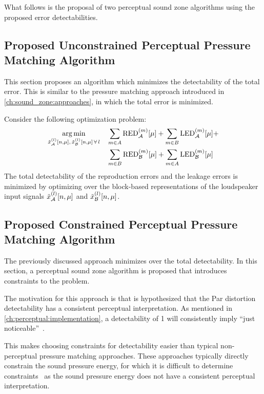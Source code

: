 What follows is the proposal of two perceptual sound zone algorithms using the proposed error detectabilities.

\subsection{Proposed Unconstrained Perceptual Pressure Matching Algorithm}
\label{ch:perceptual_sound_zone:perceptual_minimization:unconstrained}
This section proposes an algorithm which minimizes the detectability of the total error.
This is similar to the pressure matching approach introduced in \autoref{ch:sound_zone:approaches}, 
in which the total error is minimized.

Consider the following optimization problem:
\begin{equation}
    \begin{aligned}
    \argmin{\tilde{x}_\za^{(l)}[n,\mu],\,\tilde{x}_\zb^{(l)}[n,\mu]\,\forall\,l}{
       & \sum_{m\in A}\text{RED}_\za^{(m)}[\mu] + \sum_{m\in B}\text{LED}_\za^{(m)}[\mu] +\\
       & \sum_{m\in B}\text{RED}_\zb^{(m)}[\mu] + \sum_{m\in A}\text{LED}_\zb^{(m)}[\mu]
    }
    \end{aligned}
\end{equation}
The total detectability of the reproduction errors and the leakage errors is minimized by optimizing over the 
block-based representations of the loudspeaker input signals $\tilde{x}_{\mathcal{A}}^{(l)}[n,\mu]$ and $\tilde{x}_{\mathcal{B}}^{(l)}[n,\mu]$.

\subsection{Proposed Constrained Perceptual Pressure Matching Algorithm}
\label{ch:perceptual_sound_zone:perceptual_minimization:constrained}
The previously discussed approach minimizes over the total detectability.
In this section, a perceptual sound zone algorithm is proposed that introduces constraints to the problem. 

The motivation for this approach is that is hypothesized that the Par distortion detectability has a consistent perceptual interpretation.
As mentioned in \autoref{ch:perceptual:implementation}, a detectability of 1 will consistently imply ``just noticeable''~\cite{van2005perceptual}.

This makes choosing constraints for detectability easier than typical non-perceptual pressure matching approaches.
These approaches typically directly constrain the sound pressure energy,
for which it is difficult to determine constraints~\cite{shi2021generation} as the sound pressure energy does not have a consistent perceptual interpretation.

